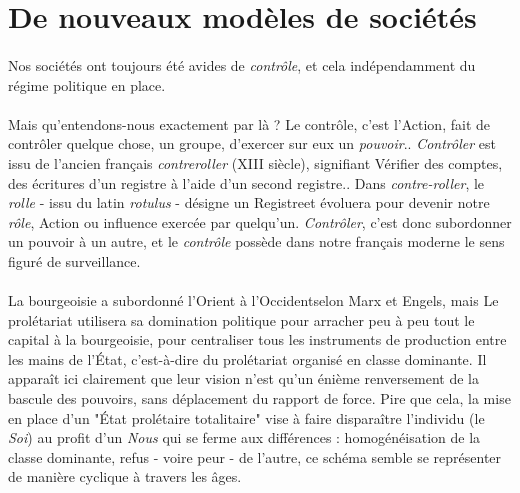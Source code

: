 \section{De nouveaux modèles de sociétés}

\paragraph{} Nos sociétés ont toujours été avides de \emph{contrôle}, et cela indépendamment du régime politique en 
place. 

\paragraph{} Mais qu'entendons-nous exactement par là ? Le contrôle, c'est l'\guillemotleft Action, fait de contrôler
quelque chose, un groupe, d'exercer sur eux un \emph{pouvoir}.\guillemotright. \cite{Controle0} \emph{Contrôler} est
issu de l'ancien français \emph{contreroller} (XIII siècle), signifiant \guillemotleft Vérifier des comptes, des
écritures d'un registre à l'aide d'un second registre.\guillemotright. \cite{Controle1} Dans \emph{contre-roller}, le 
\emph{rolle} - issu du latin \emph{rotulus} - désigne un \guillemotleft Registre\guillemotright  et évoluera pour devenir
notre \emph{rôle}, \guillemotleft Action ou influence exercée par quelqu'un\guillemotright. \emph{Contrôler}, c'est donc
subordonner un pouvoir à un autre, et le \emph{contrôle} possède dans notre français moderne le sens figuré de \guillemotleft
surveillance\guillemotright.

\paragraph{} \guillemotleft La bourgeoisie a subordonné l'Orient à l'Occident\guillemotright  selon Marx et Engels,
mais \guillemotleft Le prolétariat utilisera sa domination politique pour arracher peu à peu tout le capital à la
bourgeoisie, pour centraliser tous les instruments de production entre les mains de l'État, c'est-à-dire du prolétariat
organisé en classe dominante\guillemotright. \cite{Marx1} Il apparaît ici clairement que leur vision
n'est qu'un énième renversement de la bascule des pouvoirs, sans déplacement du rapport de force. Pire que cela, la mise
en place d'un "État prolétaire totalitaire" vise à faire disparaître l'individu (le \emph{Soi}) au profit d'un \emph{Nous}
qui se ferme aux différences : homogénéisation de la classe dominante, refus - voire peur - de l'autre, ce schéma semble
se représenter de manière cyclique à travers les âges.

